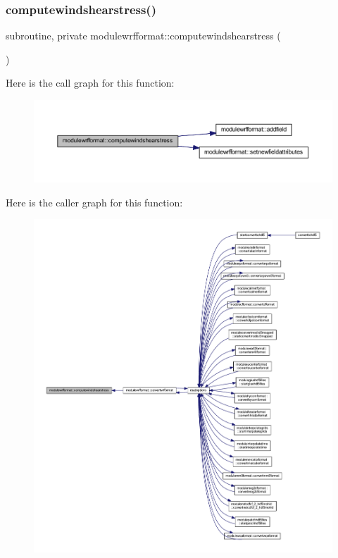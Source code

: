 \subsubsection{\texorpdfstring{computewindshearstress()}{computewindshearstress()}}
{\footnotesize\ttfamily subroutine, private modulewrfformat\+::computewindshearstress (\begin{DoxyParamCaption}{ }\end{DoxyParamCaption})\hspace{0.3cm}{\ttfamily [private]}}

Here is the call graph for this function\+:\nopagebreak
\begin{figure}[H]
\begin{center}
\leavevmode
\includegraphics[width=350pt]{namespacemodulewrfformat_ae1dd204b5805dcd24b48624ce696dca4_cgraph}
\end{center}
\end{figure}
Here is the caller graph for this function\+:\nopagebreak
\begin{figure}[H]
\begin{center}
\leavevmode
\includegraphics[width=350pt]{namespacemodulewrfformat_ae1dd204b5805dcd24b48624ce696dca4_icgraph}
\end{center}
\end{figure}
\mbox{\label{namespacemodulewrfformat_aa3ccdff7cc5b06191d188f87afe1905a}} 
